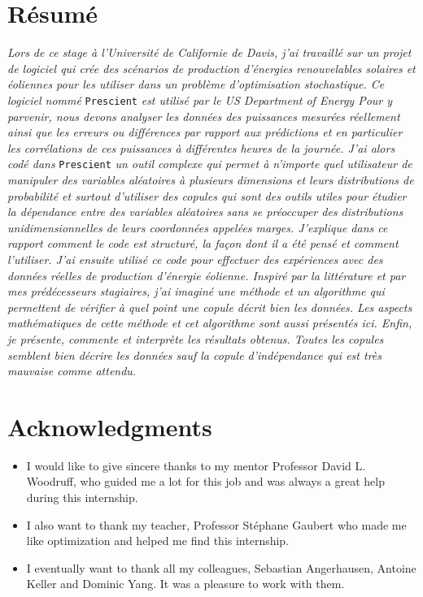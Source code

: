 \documentclass{article}
\begin{document}
   \section*{Résumé}
   \textit{
   Lors de ce stage à l'Université de Californie de Davis, j'ai travaillé sur un projet de logiciel qui crée des scénarios de production d'énergies renouvelables solaires et éoliennes pour les utiliser dans un problème d'optimisation stochastique. Ce logiciel nommé} \texttt{Prescient} \textit{est utilisé par le US Department of Energy Pour y parvenir, nous devons analyser les données des puissances mesurées réellement ainsi que les erreurs ou différences par rapport aux prédictions et en particulier les corrélations de ces puissances à différentes heures de la journée. J'ai alors codé dans} \texttt{Prescient} \textit{un outil complexe qui permet à n'importe quel utilisateur de manipuler des variables aléatoires à plusieurs dimensions et leurs distributions de probabilité et surtout d'utiliser des copules qui sont des outils utiles pour étudier la dépendance entre des variables aléatoires sans se préoccuper des distributions unidimensionnelles de leurs coordonnées appelées marges. J'explique dans ce rapport comment le code est structuré, la façon dont il a été pensé et comment l'utiliser. J'ai ensuite utilisé ce code pour effectuer des expériences avec des données réelles de production d'énergie éolienne. Inspiré par la littérature et par mes prédécesseurs stagiaires, j'ai imaginé une méthode et un algorithme qui permettent de vérifier à quel point une copule décrit bien les données. Les aspects mathématiques de cette méthode et cet algorithme sont aussi présentés ici. Enfin, je présente, commente et interprète les résultats obtenus. Toutes les copules semblent bien décrire les données sauf la copule d'indépendance qui est très mauvaise comme attendu.}
   \newpage
   \section*{Acknowledgments}
   \begin{itemize}
   \item
   I would like to give sincere thanks to my mentor Professor David L. Woodruff, who guided me a lot for this job and was always a great help during this internship.
   \item
   I also want to thank my teacher, Professor St\'ephane Gaubert who made me like optimization and helped me find this internship.
   \item
   I eventually want to thank all my colleagues, Sebastian Angerhausen, Antoine Keller and Dominic Yang. It was a pleasure to work with them.
   
   \end{itemize}
   \newpage
   
\end{document}
